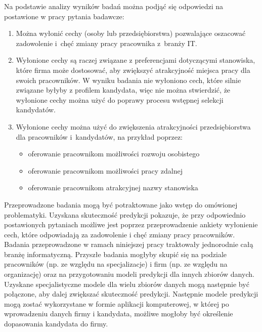 Na podstawie analizy wyników badań można podjąć się odpowiedzi na postawione w pracy pytania badawcze:
\begin{enumerate}
    \item Można wyłonić cechy (osoby lub przedsiębiorstwa) pozwalające oszacować zadowolenie i~chęć zmiany pracy pracownika z~branży IT.
    \item Wyłonione cechy są raczej związane z preferencjami dotyczącymi stanowiska, które firma może dostosować, aby zwiększyć atrakcyjność miejsca pracy dla swoich pracowników. W wyniku badania nie wyłoniono cech, które silnie związane byłyby z profilem kandydata, więc nie można stwierdzić, że wyłonione cechy można użyć do poprawy procesu wstępnej selekcji kandydatów.
    \item Wyłonione cechy można użyć do zwiększenia atrakcyjności przedsiębiorstwa dla pracowników i~kandydatów, na przykład poprzez:
    \begin{itemize}
        \item oferowanie pracownikom możliwości rozwoju osobistego
        \item oferowanie pracownikom możliwości pracy zdalnej
        \item oferowanie pracownikom atrakcyjnej nazwy stanowiska
        \end{itemize}
\end{enumerate}

Przeprowadzone badania mogą być potraktowane jako wstęp do omówionej problematyki.
Uzyskana skuteczność predykcji pokazuje, że przy odpowiednio postawionych pytaniach możliwe jest poprzez przeprowadzenie ankiety wyłonienie cech, które odpowiadają za zadowolenie i chęć zmiany pracy pracowników.
Badania przeprowadzone w ramach niniejszej pracy traktowały jednorodnie całą branżę informatyczną.
Przyszłe badania mogłyby skupić się na podziale pracowników (np. ze względu na specjalizacje) i firm (np. ze względu na organizację) oraz na przygotowaniu modeli predykcji dla innych zbiorów danych.
Uzyskane specjalistyczne modele dla wielu zbiorów danych mogą następnie być połączone, aby dalej zwiększać skuteczność predykcji.
Następnie modele predykcji mogą zostać wykorzystane w formie aplikacji komputerowej, w której po wprowadzeniu danych firmy i kandydata, możliwe mogłoby być określenie dopasowania kandydata do firmy.


\thispagestyle{normal}
